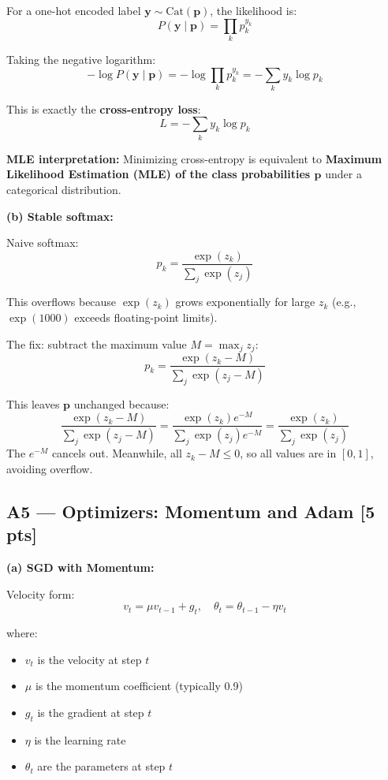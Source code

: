 \documentclass[11pt,a4paper]{article}
\begin{document}
For a one-hot encoded label $\mathbf{y} \sim \text{Cat}(\mathbf{p})$, the likelihood is:
\[
P(\mathbf{y} \mid \mathbf{p}) = \prod_k p_k^{y_k}
\]

Taking the negative logarithm:
\[
-\log P(\mathbf{y} \mid \mathbf{p}) = -\log \prod_k p_k^{y_k} = -\sum_k y_k \log p_k
\]

This is exactly the \textbf{cross-entropy loss}:
\[
L = -\sum_k y_k \log p_k
\]

\textbf{MLE interpretation:} Minimizing cross-entropy is equivalent to \textbf{Maximum Likelihood Estimation (MLE) of the class probabilities $\mathbf{p}$} under a categorical distribution.

\textbf{(b) Stable softmax:}

Naive softmax:
\[
p_k = \frac{\exp(z_k)}{\sum_j \exp(z_j)}
\]

This overflows because $\exp(z_k)$ grows exponentially for large $z_k$ (e.g., $\exp(1000)$ exceeds floating-point limits).

The fix: subtract the maximum value $M = \max_j z_j$:
\[
p_k = \frac{\exp(z_k - M)}{\sum_j \exp(z_j - M)}
\]

This leaves $\mathbf{p}$ unchanged because:
\[
\frac{\exp(z_k - M)}{\sum_j \exp(z_j - M)}
= \frac{\exp(z_k)e^{-M}}{\sum_j \exp(z_j)e^{-M}}
= \frac{\exp(z_k)}{\sum_j \exp(z_j)}
\]
The $e^{-M}$ cancels out. Meanwhile, all $z_k - M \leq 0$, so all values are in $[0, 1]$, avoiding overflow.

\subsection*{A5 --- Optimizers: Momentum and Adam \hfill [5 pts]}

\textbf{(a) SGD with Momentum:}

Velocity form:
\[
v_t = \mu v_{t-1} + g_t, \quad \theta_t = \theta_{t-1} - \eta v_t
\]

where:
\begin{itemize}
    \item $v_t$ is the velocity at step $t$
    \item $\mu$ is the momentum coefficient (typically 0.9)
    \item $g_t$ is the gradient at step $t$
    \item $\eta$ is the learning rate
    \item $\theta_t$ are the parameters at step $t$
\end{itemize}
\end{document}

